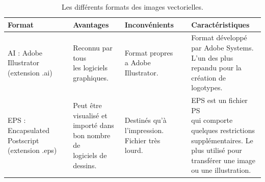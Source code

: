 \begin{table}[H]
	\centering
	\caption{Les différents formats des images vectorielles.}
	\begin{tabular}{|l|l|l|l|}
		
		\hline
		\textbf{Format} & \textbf{Avantages} &
		\textbf{Inconvénients} & \textbf{Caractéristiques} \\
		\hline
		\makecell{AI : Adobe\\
			Illustrator \\(extension .ai)}
		 & \makecell{Reconnu par\\
			tous\\
			les logiciels\\
			graphiques.} & \makecell{Format propres\\ a
		Adobe Illustrator.}
		&  \makecell{Format développé\\
			par Adobe Systems.\\
			L'un des plus\\
			repandu pour la\\
			création de logotypes.}   \\
		\hline
		
		\makecell{EPS :
			Encapsulated\\
			Postscript\\
			(extension
			.eps)}
		& \makecell{Peut être\\
			visualisé et\\
			importé dans\\
			bon nombre de\\
			logiciels de\\
			dessins.} 
		& \makecell{Destinés qu'à\\
			l'impression.\\
			Fichier très\\
			lourd.}
		&  \makecell{EPS est un fichier PS\\
			qui comporte\\
			quelques restrictions\\
			supplémentaires. Le\\
			plus utilisé pour\\
			transférer une image\\
			ou une illustration.}   \\
		\hline
	

\end{tabular}
\end{table}
